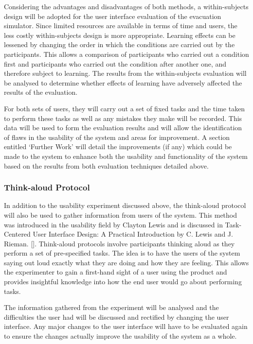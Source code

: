 Considering the advantages and disadvantages of both methods, a within-subjects design will be adopted for the user interface evaluation of the evacuation simulator. Since limited resources are available in terms of time and users, the less costly within-subjects design is more appropriate. Learning effects can be lessened by changing the order in which the conditions are carried out by the participants. This allows a comparison of participants who carried out a condition first and participants who carried out the condition after another one, and therefore subject to learning. The results from the within-subjects evaluation will be analysed to determine whether effects of learning have adversely affected the results of the evaluation.

For both sets of users, they will carry out a set of fixed tasks and the time taken to perform these tasks as well as any mistakes they make will be recorded. This data will be used to form the evaluation results and will allow the identification of flaws in the usability of the system and areas for improvement. A section entitled ‘Further Work’ will detail the improvements (if any) which could be made to the system to enhance both the usability and functionality of the system based on the results from both evaluation techniques detailed above.

\subsubsection{Think-aloud Protocol}
In addition to the usability experiment discussed above, the think-aloud protocol will also be used to gather information from users of the system. This method was introduced in the usability field by Clayton Lewis and is discussed in Task-Centered User Interface Design: A Practical Introduction by C. Lewis and J. Rieman. []. Think-aloud protocols involve participants thinking aloud as they perform a set of pre-specified tasks. The idea is to have the users of the system saying out loud exactly what they are doing and how they are feeling. This allows the experimenter to gain a first-hand sight of a user using the product and provides insightful knowledge into how the end user would go about performing tasks.

The information gathered from the experiment will be analysed and the difficulties the user had will be discussed and rectified by changing the user interface. Any major changes to the user interface will have to be evaluated again to ensure the changes actually improve the usability of the system as a whole. 

